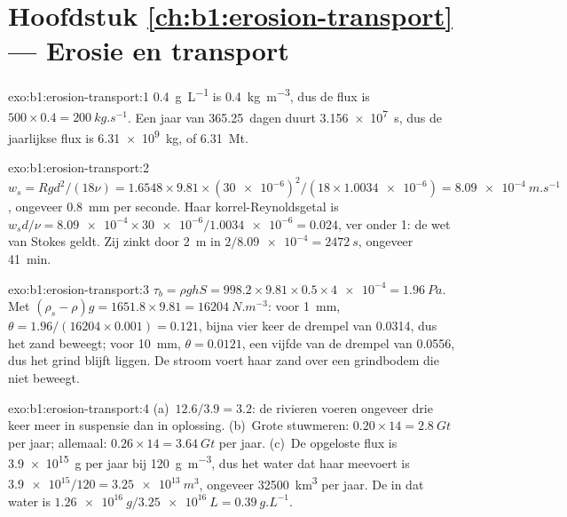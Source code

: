 \section*{Hoofdstuk \ref{ch:b1:erosion-transport} --- Erosie en transport}

\begin{solution}{exo:b1:erosion-transport:1}
\qty{0.4}{g.L^{-1}} is \qty{0.4}{kg.m^{-3}}, dus de flux is $500 \times 0.4 =
\qty{200}{kg.s^{-1}}$. Een jaar van \num{365.25}~dagen duurt
\qty{3.156e7}{s}, dus de jaarlijkse flux is \qty{6.31e9}{kg}, of
\qty{6.31}{Mt}.
\end{solution}

\begin{solution}{exo:b1:erosion-transport:2}
$w_s = R g d^2/(18\nu) = 1.6548 \times 9.81 \times (\num{30e-6})^2/(18 \times
\num{1.0034e-6}) = \qty{8.09e-4}{m.s^{-1}}$, ongeveer \qty{0.8}{mm} per seconde. Haar
korrel-Reynoldsgetal is $w_s d/\nu = \num{8.09e-4} \times
\num{30e-6}/\num{1.0034e-6} = 0.024$, ver onder 1: de wet van Stokes geldt. Zij zinkt
door \qty{2}{m} in $2/\num{8.09e-4} = \qty{2472}{s}$, ongeveer
\qty{41}{min}.
\end{solution}

\begin{solution}{exo:b1:erosion-transport:3}
$\tau_b = \rho g h S = 998.2 \times 9.81 \times 0.5 \times \num{4e-4} =
\qty{1.96}{Pa}$. Met $(\rho_s - \rho) g = 1651.8 \times 9.81 =
\qty{16204}{N.m^{-3}}$: voor \qty{1}{mm}, $\theta = 1.96/(16204 \times 0.001) =
0.121$, bijna vier keer de drempel van \num{0.0314}, dus het zand beweegt; voor
\qty{10}{mm}, $\theta = 0.0121$, een vijfde van de drempel van \num{0.0556}, dus het
grind blijft liggen. De stroom voert haar zand over een grindbodem die niet beweegt.
\end{solution}

\begin{solution}{exo:b1:erosion-transport:4}
(a)~$12.6/3.9 = 3.2$: de rivieren voeren ongeveer drie keer meer in suspensie dan in
oplossing. (b)~Grote stuwmeren: $0.20 \times 14 = \qty{2.8}{Gt}$ per jaar; allemaal:
$0.26 \times 14 = \qty{3.64}{Gt}$ per jaar. (c)~De opgeloste flux is
\qty{3.9e15}{g} per jaar bij \qty{120}{g.m^{-3}}, dus het water dat haar meevoert is
$\num{3.9e15}/120 = \qty{3.25e13}{m^3}$, ongeveer \qty{32500}{km^3} per jaar. De
 in dat water is $\qty{1.26e16}{g}/\qty{3.25e16}{L} =
\qty{0.39}{g.L^{-1}}$.
\end{solution}

